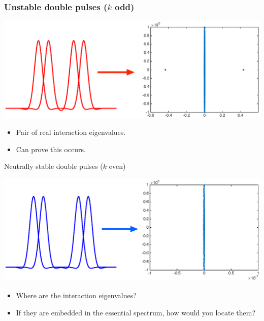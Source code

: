 \documentclass[16pt]{beamer}
\begin{document}
\begin{frame}
	\frametitle{Unstable double pulses ($k$ odd)}
	\fontsize{16}{7.2}\selectfont
	\begin{center}
		\includegraphics[width=1\linewidth]{images/doubleunstableeig}
	\end{center}
	\begin{itemize}
	\item Pair of real interaction eigenvalues.
	\item Can prove this occurs.
	\end{itemize}
\end{frame}

\begin{frame}{Neutrally stable double pulses ($k$ even)}
	\fontsize{16}{7.2}\selectfont
	\begin{center}
		\includegraphics[width=1\linewidth]{images/doublestableeig}
	\end{center}
	\begin{itemize}
	\item Where are the interaction eigenvalues?
	\item If they are embedded in the essential spectrum, how would you locate them?
	\end{itemize}
\end{frame}
\end{document}
